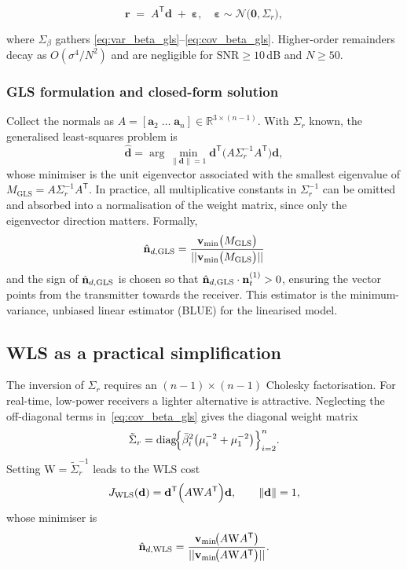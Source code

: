 \documentclass[lettersize,journal]{IEEEtran}
\begin{document}
\[
  \mathbf r \;=\; A^{\mathsf T}\mathbf d \;+\;\boldsymbol\varepsilon,
  \quad
  \boldsymbol\varepsilon \sim \mathcal N\bigl(\mathbf0,\Sigma_r\bigr),
\]

where $\Sigma_\beta$ gathers
\eqref{eq:var_beta_gls}–\eqref{eq:cov_beta_gls}.
Higher-order remainders decay as
$O(\sigma^{4}/N^{2})$ and are negligible for
$\mathrm{SNR}\!\ge\!10$\,dB and $N\!\ge\!50$.



\subsubsection{GLS formulation and closed-form solution}
Collect the normals as
$A=[\mathbf a_2\;\dots\;\mathbf a_n]\in\mathbb R^{3\times(n-1)}$.
With $\Sigma_r$ known, the generalised least-squares problem is
\[
  \hat{\mathbf d}
  =\arg\min_{\|\mathbf d\|=1}
     \mathbf d^{\mathsf T}
     \bigl(A\Sigma_r^{-1}A^{\mathsf T}\bigr)\mathbf d,
\]
whose minimiser is the unit eigenvector associated with the
smallest eigenvalue of
$
  M_{\text{GLS}}
  =A\Sigma_r^{-1}A^{\mathsf T}.
$
In practice, all multiplicative constants in $\Sigma_r^{-1}$ can be
omitted and absorbed into a normalisation of the weight matrix,
since only the eigenvector direction matters. Formally,
\begin{equation}
    \hat{\mathbf{n}}_{d,\rm GLS}
    =\frac{\mathbf v_{\min}\bigl(M_{\text{GLS}}\bigr)}{||\mathbf v_{\min}\bigl(M_{\text{GLS}}\bigr)||}
  \label{eq:gls_dir_final}
\end{equation}
and the sign of $\hat{\mathbf{n}}_{d,\rm GLS}$ is chosen so that
$\hat{\mathbf{n}}_{d,\rm GLS}\cdot\mathbf n_t^{(1)}>0$,
ensuring the vector points from the transmitter towards the receiver.
This estimator is the minimum-variance, unbiased
linear estimator (BLUE) for the linearised model.

\subsection{WLS as a practical simplification}

The inversion of $\Sigma_r$ requires an $(n-1)\!\times\!(n-1)$
Cholesky factorisation.  For real-time, low-power receivers a lighter
alternative is attractive.
Neglecting the off-diagonal terms in~\eqref{eq:cov_beta_gls} gives the 
diagonal weight matrix
\[
\tilde\Sigma_r
  =\operatorname{diag}\!\Bigl\{
       \bar\beta_i^{2}\bigl(\mu_i^{-2}+\mu_1^{-2}\bigr)
     \Bigr\}_{i=2}^{n}.
\]
Setting $\mathrm{W}=\tilde\Sigma_r^{-1}$ leads to the WLS cost
\[
  J_{\text{WLS}}(\mathbf d)
  =
  \mathbf d^{\mathsf T}
  \Bigl(A\mathrm{W}A^{\mathsf T}\Bigr)\mathbf d,
  \qquad\|\mathbf d\|=1,
\]
whose minimiser is
\begin{equation}
  \hat{\mathbf{n}}_{d,\rm WLS}
   =\frac{\mathbf v_{\min}\!\bigl(A\mathrm{W}A^{\mathsf T}\bigr)}{||\mathbf v_{\min}\!\bigl(A\mathrm{W}A^{\mathsf T}\bigr)||}.
  \label{eq:WLS_solution}
\end{equation}
\end{document}
